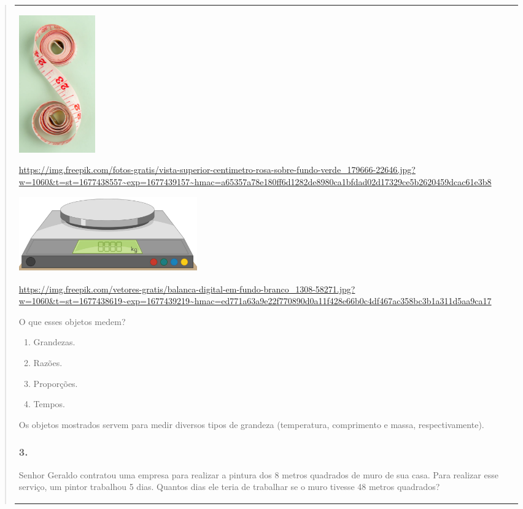 \begin{enumerate}
\begin{escolha}
\begin{enumerate}
\begin{itemize}
\begin{itemize}
\begin{escolha}
\begin{quote}
\begin{escolha}
{\begin{longtable}[]{@{}l@{}}
\begin{itemize}
\includegraphics[width=1.29167in,height=2.33463in]{media/image129.png}

\url{https://img.freepik.com/fotos-gratis/vista-superior-centimetro-rosa-sobre-fundo-verde_179666-22646.jpg?w=1060\&t=st=1677438557~exp=1677439157~hmac=a65357a78e180ff6d1282de8980ca1bfdad02d17329ce5b2620459dcac61e3b8}

\includegraphics[width=3.02500in,height=1.27488in]{media/image130.png}

\url{https://img.freepik.com/vetores-gratis/balanca-digital-em-fundo-branco_1308-58271.jpg?w=1060\&t=st=1677438619~exp=1677439219~hmac=ed771a63a9e22f770890d0a11f428e66b0c4df467ac358bc3b1a311d5aa9ca17}

O que esses objetos medem?

\begin{enumerate}
\def\labelenumi{\alph{enumi})}
\item
  Grandezas.
\item
  Razões.
\item
  Proporções.
\item
  Tempos.
\end{enumerate}

Os objetos mostrados servem para medir diversos tipos de grandeza (temperatura, comprimento e massa, respectivamente).

\subsubsection{3.}\label{section-119}

Senhor Geraldo contratou uma empresa para realizar a pintura dos 8
metros quadrados de muro de sua casa. Para realizar esse serviço, um pintor
trabalhou 5 dias. Quantos dias ele teria de trabalhar se o muro tivesse
48 metros quadrados?


\end{itemize}
\end{longtable}}
\end{escolha}
\end{quote}
\end{escolha}
\end{itemize}
\end{itemize}
\end{enumerate}
\end{escolha}
\end{enumerate}
